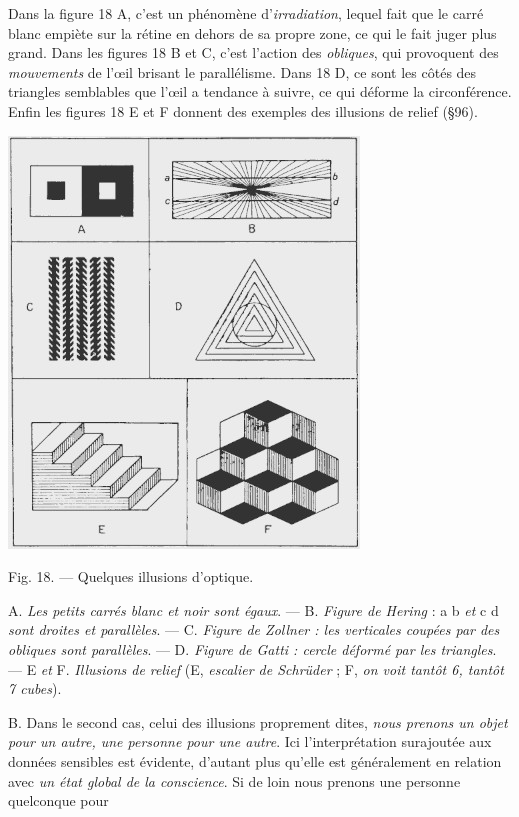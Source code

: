 \vspace{0.24cm}
{\footnotesize 
Dans la figure 18 A, c’est un phénomène d'{\it irradiation}, lequel fait que le
carré blanc empiète sur la rétine en dehors de sa propre zone, ce qui le fait
juger plus grand. Dans les figures 18 B et C, c’est l’action des {\it obliques},
qui provoquent des {\it mouvements} de l'œil brisant le parallélisme. Dans
18 D, ce sont les côtés des triangles semblables que l’œil a tendance à
suivre, ce qui déforme la circonférence. Enfin les figures 18 E et F donnent
des exemples des illusions de relief (\S 96).}
\vspace{0.31cm}
\begin{center}
\includegraphics[scale=0.7]{./05_sensible/018}

Fig. 18. — Quelques illusions d'optique.
\end{center}
A. {\it Les petits carrés blanc et noir sont égaux}. — B. {\it Figure de Hering} : a b {\it et} c d {\it sont droites
et parallèles}. — C. {\it Figure de Zollner : les verticales coupées par des obliques sont parallèles}.
— D. {\it Figure de Gatti : cercle déformé par les triangles}. — E {\it et} F. {\it Illusions de
relief} (E, {\it escalier de Schrüder} ; F, {\it on voit tantôt 6, tantôt 7 cubes}).

{\it }B. Dans le second cas, celui des illusions proprement dites, {\it nous prenons
un objet pour un autre, une personne pour une autre}. Ici l’interprétation
surajoutée aux données sensibles est évidente, d’autant
plus qu’elle est généralement en relation avec {\it un état global de la
conscience}. Si de loin nous prenons une personne quelconque pour


